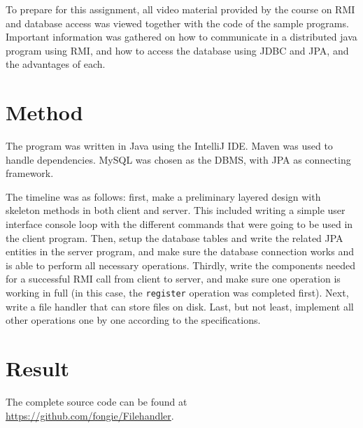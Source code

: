 \documentclass[a4paper]{scrartcl}
\def\code#1{\texttt{#1}}
\begin{document}
To prepare for this assignment, all video material provided by the course on RMI and database access was viewed together with the code of the sample programs. Important information was gathered on how to communicate in a distributed java program using RMI, and how to access the database using JDBC and JPA, and the advantages of each.

\section{Method}

\noindent The program was written in Java using the IntelliJ IDE. Maven was used to handle dependencies. MySQL was chosen as the DBMS, with JPA as connecting framework.

The timeline was as follows: first, make a preliminary layered design with skeleton methods in both client and server. This included writing a simple user interface console loop with the different commands that were going to be used in the client program. Then, setup the database tables and write the related JPA entities in the server program, and make sure the database connection works and is able to perform all necessary operations. Thirdly, write the components needed for a successful RMI call from client to server, and make sure one operation is working in full (in this case, the \code{register} operation was completed first). Next, write a file handler that can store files on disk. Last, but not least, implement all other operations one by one according to the specifications.

\section{Result}

\noindent The complete source code can be found at \href{https://github.com/fongie/Filehandler}{https://github.com/fongie/Filehandler}.
\end{document}
